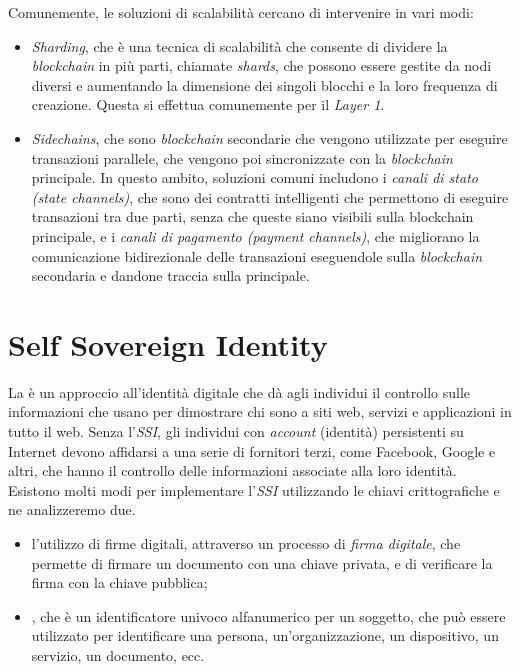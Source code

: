 Comunemente, le soluzioni di scalabilità cercano di intervenire in vari modi:
\begin{itemize}
    \item{\textit{Sharding}}, che è una tecnica di scalabilità che consente di dividere la \textit{blockchain} in più parti, chiamate \textit{shards}, che possono essere gestite da nodi diversi e aumentando
    la dimensione dei singoli blocchi e la loro frequenza di creazione. Questa si effettua comunemente per il \textit{Layer 1}.
    \item{\textit{Sidechains}}, che sono \textit{blockchain} secondarie che vengono utilizzate per eseguire transazioni parallele, che vengono poi sincronizzate con la \textit{blockchain} principale.
    In questo ambito, soluzioni comuni includono i \textit{canali di stato (state channels)}, che sono dei contratti intelligenti che permettono di eseguire transazioni tra due parti, senza che queste siano visibili sulla blockchain principale,
    e i \textit{canali di pagamento (payment channels)}, che migliorano la comunicazione bidirezionale delle transazioni eseguendole sulla \textit{blockchain} secondaria e dandone traccia sulla principale.
\end{itemize}

\section{Self Sovereign Identity}\label{sec:self-sovereign-identity}

La  è un approccio all'identità digitale che dà agli individui 
il controllo sulle informazioni che usano per dimostrare chi sono a siti web, servizi e applicazioni in tutto il web. 
Senza l'\textit{SSI}, gli individui con \textit{account} (identità) persistenti su Internet devono affidarsi a una serie di fornitori terzi, come Facebook, Google e altri,
che hanno il controllo delle informazioni associate alla loro identità. \\

Esistono molti modi per implementare l'\textit{SSI}  utilizzando le chiavi crittografiche e ne analizzeremo due.
\begin{itemize}
    \item l'utilizzo di firme digitali, attraverso un processo di \textit{firma digitale}, che permette di firmare un documento con una chiave privata, e di verificare la firma con la chiave pubblica;
    \item {}, che è un identificatore univoco alfanumerico per un soggetto, che può essere utilizzato per identificare una persona, un'organizzazione, un dispositivo, un servizio, un documento, ecc.
\end{itemize}  

